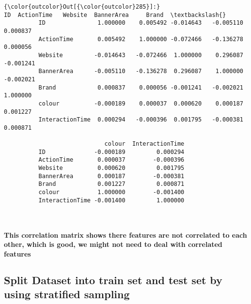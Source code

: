 \documentclass[11pt]{article}
\begin{document}
\begin{Verbatim}[commandchars=\\\{\}]
{\color{outcolor}Out[{\color{outcolor}285}]:}                        ID  ActionTime   Website  BannerArea     Brand  \textbackslash{}
          ID               1.000000    0.005492 -0.014643   -0.005110  0.000837   
          ActionTime       0.005492    1.000000 -0.072466   -0.136278  0.000056   
          Website         -0.014643   -0.072466  1.000000    0.296087 -0.001241   
          BannerArea      -0.005110   -0.136278  0.296087    1.000000 -0.002021   
          Brand            0.000837    0.000056 -0.001241   -0.002021  1.000000   
          colour          -0.000189    0.000037  0.000620    0.000187  0.001227   
          InteractionTime  0.000294   -0.000396  0.001795   -0.000381  0.000871   
          
                             colour  InteractionTime  
          ID              -0.000189         0.000294  
          ActionTime       0.000037        -0.000396  
          Website          0.000620         0.001795  
          BannerArea       0.000187        -0.000381  
          Brand            0.001227         0.000871  
          colour           1.000000        -0.001400  
          InteractionTime -0.001400         1.000000  
\end{Verbatim}
            
    \begin{center}
    \end{center}
    { \hspace*{\fill} \\}
    
    \paragraph{This correlation matrix shows there features are not
correlated to each other, which is good, we might not need to deal with
correlated
features}\label{this-correlation-matrix-shows-there-features-are-not-correlated-to-each-other-which-is-good-we-might-not-need-to-deal-with-correlated-features}

    \subsection{Split Dataset into train set and test set by using
stratified
sampling}\label{split-dataset-into-train-set-and-test-set-by-using-stratified-sampling}
\end{document}
